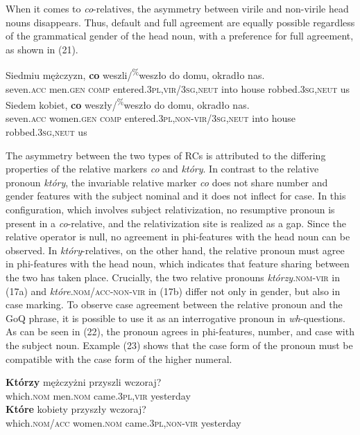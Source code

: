 \documentclass[output=paper]{langsci/langscibook}
\begin{document}
When it comes to \textit{co}{}-relatives, the asymmetry between virile and non-virile head nouns disappears. Thus, default and full agreement are equally possible regardless of the grammatical gender of the head noun, with a preference for full agreement, as shown in (21).
 
\ea%
    \label{ex:leska:21}
    \ea
    \gll Siedmiu   mężczyzn,   \textbf{co}   weszli/\textsuperscript{\%}weszło     do domu, okradło     nas.\\
         seven.\textsc{acc}   men.\textsc{gen}   \textsc{comp}   entered.\textsc{3pl,vir}/\textsc{3sg,neut} into         house   robbed.\textsc{3sg,neut} us\\
    \ex
    \gll Siedem   kobiet,   \textbf{co}   weszły/\textsuperscript{\%}weszło    do   domu,   okradło     nas.      \\
         seven.\textsc{acc}   women.\textsc{gen}   \textsc{comp}   entered.\textsc{3pl,non-vir/3sg,neut}    into   house     robbed.\textsc{3sg,neut} us \\
    \z
\z    

The asymmetry between the two types of RCs is attributed to the differing properties of the relative markers \textit{co} and \textit{który}. In contrast to the relative pronoun \textit{który}, the invariable relative marker \textit{co} does not share number and gender features with the subject nominal and it does not inflect for case. In this configuration, which involves subject relativization, no resumptive pronoun is present in a \textit{co}{}-relative, and the relativization site is realized as a gap. Since the relative operator is null, no agreement in phi-features with the head noun can be observed. In \textit{który}{}-relatives, on the other hand, the relative pronoun must agree in phi-features with the head noun, which indicates that feature sharing between the two has taken place. Crucially, the two relative pronouns \textit{którzy}.\textsc{nom-vir} in (17a) and \textit{które}.\textsc{nom\slash acc-non-vir} in (17b) differ not only in gender, but also in case marking. To observe case agreement between the relative pronoun and the GoQ phrase, it is possible to use it as an interrogative pronoun in \textit{wh}{}-questions. As can be seen in (22), the pronoun agrees in phi-features, number, and case with the subject noun. Example (23) shows that the case form of the pronoun must be compatible with the case form of the higher numeral.

\ea%
    \label{ex:leska:22}
    \ea
    \gll \textbf{Którzy}   mężczyżni   przyszli   wczoraj?\\
        which.\textsc{nom}   men.\textsc{nom}  came.\textsc{3pl,vir} yesterday\\
    \ex
    \gll \textbf{Które}   kobiety   przyszły     wczoraj?\\
         which.\textsc{nom/acc} women.\textsc{nom}   came.\textsc{3pl,non-vir} yesterday\\
    \z
\z    
\end{document}
